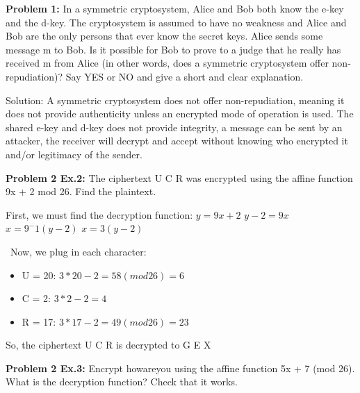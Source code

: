 \documentclass[12pt,letterpaper,final]{report}
\begin{document}

\vline


\noindent\textbf{Problem 1:} In a symmetric cryptosystem, Alice and Bob both know the e-key and the d-key. The cryptosystem is assumed to  have no weakness and Alice and Bob are the only persons that ever know the secret keys. Alice sends some message m to Bob. Is it possible for Bob to prove to a judge that he really has received m from Alice (in other words, does a symmetric cryptosystem offer non-repudiation)? Say YES or NO and give a short and clear explanation.

\bigskip  Solution: A symmetric cryptosystem does not offer non-repudiation, meaning it does not provide authenticity unless an encrypted mode of operation is used. The shared e-key and d-key does not provide integrity, a message can be sent by an attacker, the receiver will decrypt and accept without knowing who encrypted it and/or legitimacy of the sender.

\bigskip
\noindent\textbf{Problem 2 Ex.2:} The ciphertext U C R was encrypted using the affine function 9x + 2 mod 26. Find the plaintext.
\bigskip

\indent First, we must find the decryption function:
 $y = 9x + 2$
$y - 2 = 9x$
$x = 9^-1(y - 2)$
$x = 3(y - 2)$

\noindent\ Now, we plug in each character:
\begin{itemize}
\item U = 20: $3*20 - 2 = 58 (mod 26) = 6$
\item C = 2: $3*2 - 2 = 4$
\item R = 17: $3*17 - 2 = 49 (mod 26) = 23$
\end{itemize}

So, the ciphertext U C R is decrypted to G E X

\bigskip
\noindent\textbf{Problem 2 Ex.3:} Encrypt howareyou using the affine function 5x + 7 (mod 26). What is
the decryption function? Check that it works.
\end{document}
